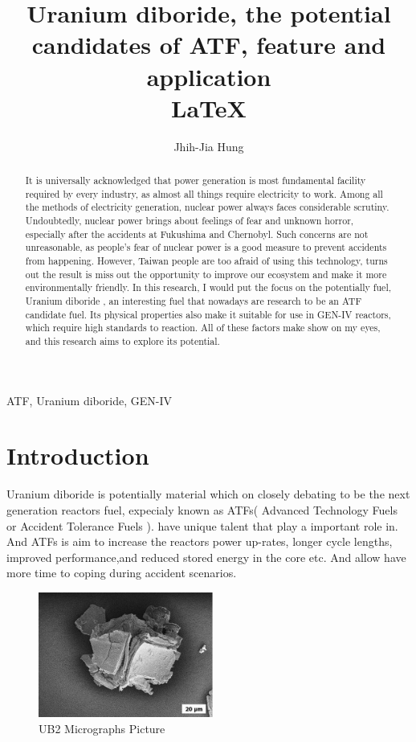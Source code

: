 \documentclass[final,10pt,times,twocolumn]{elsarticle}
\author{Jhih-Jia Hung}
\begin{document}
\begin{frontmatter}
\title{Uranium diboride, the potential candidates of ATF, feature and application \\ \LaTeX}
\begin{abstract}
It is universally acknowledged that power generation is most fundamental facility required by every industry, as almost all things require electricity to work. Among all the methods of electricity generation, nuclear power always faces considerable scrutiny. Undoubtedly, nuclear power brings about feelings of fear and unknown horror, especially after the accidents at Fukushima and Chernobyl. Such concerns are not unreasonable, as people's fear of nuclear power is a good measure to prevent accidents from happening. However, Taiwan people are too afraid of using this technology, turns out the result is miss out the opportunity to improve our ecosystem and make it more environmentally friendly. In this research, I would put the focus on the potentially fuel, Uranium diboride , an interesting fuel that nowadays are research to be an ATF candidate fuel. Its physical properties also make it suitable for use in GEN-IV reactors, which require high standards to reaction. All of these factors make  show on my eyes, and this research aims to explore its potential.
\end{abstract}

\begin{keyword}
ATF, Uranium diboride, GEN-IV
\end{keyword}

\end{frontmatter}

\section{Introduction}
Uranium diboride is potentially material which on closely debating to be the next generation reactors fuel, expecialy known as ATFs( Advanced Technology Fuels or Accident Tolerance Fuels ).  have unique talent that play a important role in. And ATFs is aim to increase the reactors power up-rates, longer cycle lengths, improved performance,and reduced stored energy in the core etc. And allow have more time to coping during accident scenarios.\cite{watkins2022challenges}

\begin{figure}[ht]
    \centering
    \includegraphics[width = 5.75cm]{UB2 Micrographs.png}
    \caption{UB2 Micrographs Picture\cite{watkins2022challenges} }
\end{figure}
\end{document}

